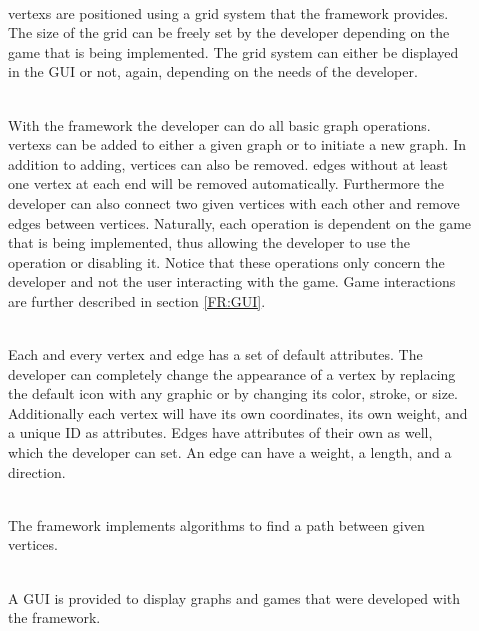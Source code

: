 \begin{description}
\item[] \textbf{} \\
\Glspl{vertex} are positioned using a grid system that the \gls{framework} provides. The size of the grid can be freely set by the \gls{developer} depending on the game that is being implemented. The grid system can either be displayed in the \gls{GUI} or not, again, depending on the needs of the developer.
   \item[] \textbf{} \\
With the framework the developer can do all basic graph operations. \Glspl{vertex} can be added to either a given \gls{graph} or to initiate a new graph. In addition to adding, vertices can also be removed. \Glspl{edge} without at least one vertex at each end will be removed automatically. Furthermore the developer can also connect two given vertices with each other and remove edges between vertices. Naturally, each operation is dependent on the game that is being implemented, thus allowing the developer to use the operation or disabling it. Notice that these operations only concern the developer and not the user interacting with the game. Game interactions are further described in section \ref{FR:GUI}.
\item[] \textbf{} \\
Each and every vertex and edge has a set of default attributes. The developer can completely change the appearance of a vertex by replacing the default icon with any graphic or by changing its color, stroke, or size. \\
Additionally each vertex will have its own coordinates, its own weight, and a unique \gls{ID} as attributes. Edges have attributes of their own as well, which the developer can set. An edge can have a weight, a length, and a direction.
\item[] \textbf{} \\
The framework implements algorithms to find a \gls{path} between given vertices.
  \item[] \textbf{} \\
  A \gls{GUI} is provided to display graphs and games that were developed with the framework.
\item[] \textbf{} \\

\end{description}
